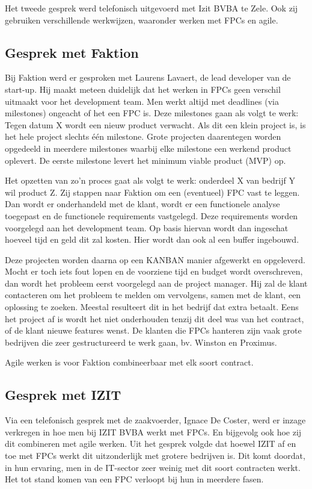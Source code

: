 \documentclass{hogent-article}
\begin{document}
    Het tweede gesprek werd telefonisch uitgevoerd met Izit BVBA te Zele. Ook zij gebruiken verschillende werkwijzen, waaronder werken met FPCs en agile.
    
    \subsection{Gesprek met Faktion}
    Bij Faktion werd er gesproken met Laurens Lavaert, de lead developer van de start-up. Hij maakt meteen duidelijk dat het werken in FPCs geen verschil uitmaakt voor het development team. Men werkt altijd met deadlines (via milestones) ongeacht of het een FPC is. Deze milestones gaan als volgt te werk: Tegen datum X wordt een nieuw product verwacht. Als dit een klein project is, is het hele project slechts één milestone. Grote projecten daarentegen worden opgedeeld in meerdere milestones waarbij elke milestone een werkend product oplevert. De eerste milestone levert het minimum viable product (MVP) op.
    
    Het opzetten van zo'n proces gaat als volgt te werk: onderdeel X van bedrijf Y wil product Z. Zij stappen naar Faktion om een (eventueel) FPC vast te leggen. Dan wordt er onderhandeld met de klant, wordt er een functionele analyse toegepast en de functionele requirements vastgelegd. Deze requirements worden voorgelegd aan het development team. Op basis hiervan wordt dan ingeschat hoeveel tijd en geld dit zal kosten. Hier wordt dan ook al een buffer ingebouwd.
    
    Deze projecten worden daarna op een KANBAN manier afgewerkt en opgeleverd. Mocht er toch iets fout lopen en de voorziene tijd en budget wordt overschreven, dan wordt het probleem eerst voorgelegd aan de project manager. Hij zal de klant contacteren om het probleem te melden om vervolgens, samen met de klant, een oplossing te zoeken. Meestal resulteert dit in het bedrijf dat extra betaalt. Eens het project af is wordt het niet onderhouden tenzij dit deel was van het contract, of de klant nieuwe features wenst. De klanten die FPCs hanteren zijn vaak grote bedrijven die zeer gestructureerd te werk gaan, bv. Winston en Proximus.
    
    Agile werken is voor Faktion combineerbaar met elk soort contract.
    
    \subsection{Gesprek met IZIT}
    Via een telefonisch gesprek met de zaakvoerder, Ignace De Coster, werd er inzage verkregen in hoe men bij IZIT BVBA werkt met FPCs. En bijgevolg ook hoe zij dit combineren met agile werken. Uit het gesprek volgde dat hoewel IZIT af en toe met FPCs werkt dit uitzonderlijk met grotere bedrijven is. Dit komt doordat, in hun ervaring, men in de IT-sector zeer weinig met dit soort contracten werkt. Het tot stand komen van een FPC verloopt bij hun in meerdere fasen.
    
\end{document}
